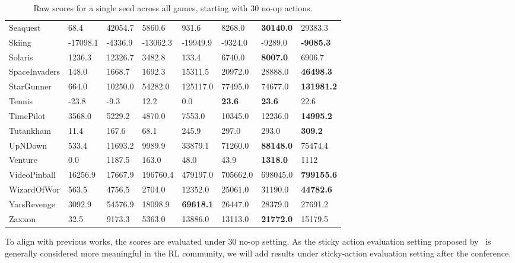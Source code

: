 \documentclass{article}
\begin{document}
\begin{table*}[ht]
\begin{tabular}{l|l|l|l|l|l|l|l}
Seaquest & 68.4 & 42054.7 & 5860.6 & 931.6 & 8268.0 & \textbf{30140.0} & 29383.3\\ 
Skiing & -17098.1 & -4336.9 & -13062.3 & -19949.9 & -9324.0 & -9289.0 & \textbf{-9085.3}\\ 
Solaris & 1236.3 & 12326.7 & 3482.8 & 133.4 & 6740.0 & \textbf{8007.0} & 6906.7\\ 
SpaceInvaders & 148.0 & 1668.7 & 1692.3 & 15311.5 & 20972.0 & 28888.0 & \textbf{46498.3}\\ 
StarGunner & 664.0 & 10250.0 & 54282.0 & 125117.0 & 77495.0 & 74677.0 & \textbf{131981.2}\\ 
Tennis & -23.8 & -9.3 & 12.2 & 0.0 & \textbf{23.6} & \textbf{23.6} & 22.6\\ 
TimePilot & 3568.0 & 5229.2 & 4870.0 & 7553.0 & 10345.0 & 12236.0 & \textbf{14995.2}\\ 
Tutankham & 11.4 & 167.6 & 68.1 & 245.9 & 297.0 & 293.0 & \textbf{309.2}\\ 
UpNDown & 533.4 & 11693.2 & 9989.9 & 33879.1 & 71260.0 & \textbf{88148.0} & 75474.4\\ 
Venture & 0.0 & 1187.5 & 163.0 & 48.0 & 43.9 & \textbf{1318.0} & 1112\\ 
VideoPinball & 16256.9 & 17667.9 & 196760.4 & 479197.0 & 705662.0 & 698045.0 & \textbf{799155.6}\\ 
WizardOfWor & 563.5 & 4756.5 & 2704.0 & 12352.0 & 25061.0 & 31190.0 & \textbf{44782.6}\\ 
YarsRevenge & 3092.9 & 54576.9 & 18098.9 & \textbf{69618.1} & 26447.0 & 28379.0 & 27691.2\\ 
Zaxxon & 32.5 & 9173.3 & 5363.0 & 13886.0 & 13113.0 & \textbf{21772.0} & 15179.5\\ 

	\end{tabular}
\caption{Raw scores for a single seed across all games, starting with 30 no-op actions.}  \label{bigtable}
\end{table*}

To align with previous works, the scores are evaluated under 30 no-op setting. As the sticky action evaluation setting proposed by~\cite{machado2018revisiting} is generally considered more meaningful in the RL community, we will add results under sticky-action evaluation setting after the conference.




%
 
\end{document}
